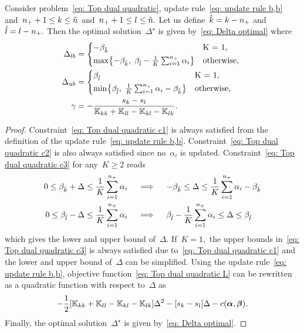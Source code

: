 \begin{lemma}
  Consider problem~\eqref{eq: Top dual quadratic}, update rule~\eqref{eq: update rule b,b} and~$n_{+} + 1 \leq k \leq \tilde{n}$ and~$n_{+} + 1 \leq l \leq \tilde{n}.$ Let us define~$\hat{k} = k - n_{+}$ and~$\hat{l} = l - n_{+}.$ Then the optimal solution~$\Delta^{\star}$ is given by~\eqref{eq: Delta optimal} where
  \begin{align*}
    \Delta_{lb} & = 
      \begin{cases*}
        -\betak & K = 1, \\
        \max \Brac[c]{- \betak,\; \betal - \frac{1}{K} \sum_{i = 1}^{\npos} \alpha_i} & \textrm{otherwise},
      \end{cases*} \\
    \Delta_{ub} & = 
      \begin{cases*}
        \betal & K = 1, \\
        \min \Brac[c]{\betal,\; \frac{1}{K} \sum_{i = 1}^{\npos} \alpha_i - \betak} & \textrm{otherwise},
      \end{cases*} \\
    \gamma & = -\frac{s_k - s_l}{\K_{kk} + \K_{ll} - \K_{kl} - \K_{lk}}.
  \end{align*}
\end{lemma}

\begin{proof}
  Constraint~\eqref{eq: Top dual quadratic c1} is always satisfied from the definition of the update rule~\eqref{eq: update rule b,b}. Constraint~\eqref{eq: Top dual quadratic c2} is also always satisfied since no~$\alpha_i$ is updated. Constraint~\eqref{eq: Top dual quadratic c3} for any~$K \geq 2$ reads
  \begin{align*}
    0 \leq \beta_{\hat{k}} + \Delta \leq \frac{1}{K} \sum_{i = 1}^{n_{+}} \alpha_i 
    & \quad \implies \quad
    -\beta_{\hat{k}} \leq \Delta \leq \frac{1}{K} \sum_{i = 1}^{n_{+}} \alpha_i - \beta_{\hat{k}} \\
    0 \leq \beta_{\hat{l}} - \Delta \leq \frac{1}{K} \sum_{i = 1}^{n_{+}} \alpha_i
    & \quad \implies \quad
    \beta_{\hat{l}} - \frac{1}{K} \sum_{i = 1}^{n_{+}} \alpha_i \leq \Delta \leq \beta_{\hat{l}}
  \end{align*}
  which gives the lower and upper bound of~$\Delta.$ If~$K = 1,$ the upper bounds in~\eqref{eq: Top dual quadratic c3} is always satisfied due to~\eqref{eq: Top dual quadratic c1} and the lower and upper bound of~$\Delta$ can be simplified. Using the update rule~\eqref{eq: update rule b,b}, objective function~\eqref{eq: Top dual quadratic L} can be rewritten as a quadratic function with respect to~$\Delta$ as
  \begin{equation*}
    - \frac{1}{2} \Brac[s]{\K_{kk} + \K_{ll} - \K_{kl} - \K_{lk}} \Delta^2
    - \Brac[s]{s_k - s_l} \Delta
    - c(\bm{\alpha}, \bm{\beta}).
  \end{equation*}
  Finally, the optimal solution~$\Delta^{\star}$ is given by~\eqref{eq: Delta optimal}.
\end{proof}

